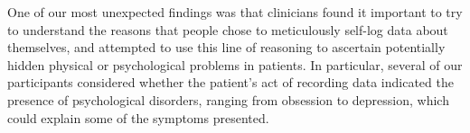 \documentclass{sigchi}
\begin{document}




%

One of our most unexpected findings was that clinicians found it important to try to understand the reasons that people chose to meticulously self-log data about themselves, and attempted to use this line of reasoning to ascertain potentially hidden physical or psychological problems in patients. In particular, several of our participants considered whether the patient's act of recording data indicated the presence of psychological disorders, ranging from obsession to depression, which could explain some of the symptoms presented. 
\end{document}

